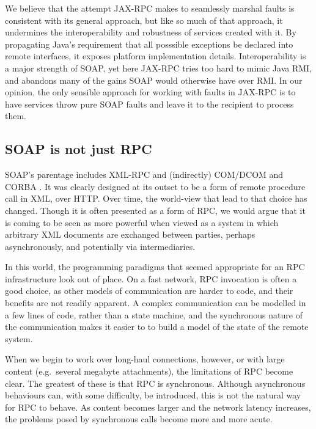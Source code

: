 We believe that the attempt JAX-RPC makes to seamlessly marshal faults
is consistent with its general approach, but like so much of that
approach, it undermines the interoperability and robustness of
services created with it. By propagating Java's requirement that all
posssible exceptions be declared into remote interfaces, it exposes
platform implementation details. Interoperability is a major strength
of SOAP, yet here JAX-RPC tries too hard to mimic Java RMI, and
abandons many of the gains SOAP would otherwise have over RMI. In our
opinion, the only sensible approach for working with faults in JAX-RPC
is to have services throw pure SOAP faults and leave it to the
recipient to process them.

\subsection{SOAP is not just RPC}
\label{objections:soap-not-just-rmi}

SOAP's parentage includes XML-RPC \cite{winer:xmlrpc} and
(indirectly) COM/DCOM \cite{dbox:com} and CORBA
\cite{vinoski:CORBA}. It was clearly designed at its outset to be a
form of remote procedure call in XML, over HTTP. Over time, the
world-view that lead to that choice has changed. Though it is often
presented as a form of RPC, we would argue that it is coming to be
seen as more powerful when viewed as a system in which arbitrary XML
documents are exchanged between parties, perhaps asynchronously, and
potentially via intermediaries.  

In this world, the programming paradigms that seemed appropriate for
an RPC infrastructure look out of place. On a fast network, RPC
invocation is often a good choice, as other models of communication
are harder to code, and their benefits are not readily apparent. A complex
communication can be modelled in a few lines of code, rather than a state
machine, and the synchronous nature of the communication makes it easier to
to build a model of the state of the remote system.  

When we begin to work over long-haul connections, however, or with
large content (e.g.\ several megabyte attachments), the limitations of
RPC become clear. The greatest of these is that RPC is
synchronous. Although asynchronous behaviours can, with some
difficulty, be introduced, this is not the natural way for RPC to
behave. As content becomes larger and the network latency increases,
the problems posed by synchronous calls become more and more acute.

